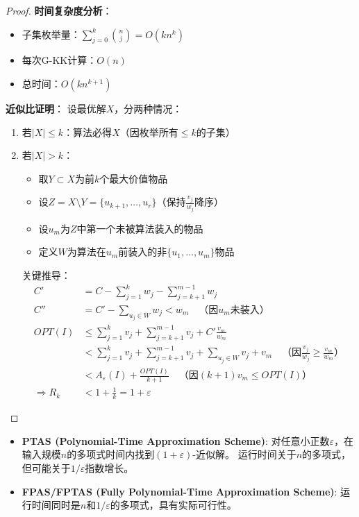 \documentclass[./../main.tex]{subfiles} %
\begin{document}
\begin{proof}
\textbf{时间复杂度分析}：
\begin{itemize}
\item 子集枚举量：$\sum_{j=0}^k \binom{n}{j} = O(kn^k)$
\item 每次G-KK计算：$O(n)$
\item 总时间：$O(kn^{k+1})$
\end{itemize}

\textbf{近似比证明}：
设最优解$X$，分两种情况：
\begin{enumerate}
    \item 若$|X| \leq k$：算法必得$X$（因枚举所有$\leq k$的子集）
    \item 若$|X| > k$：
    \begin{itemize}
        \item 取$Y \subset X$为前$k$个最大价值物品
        \item 设$Z = X \setminus Y = \{u_{k+1},\ldots,u_r\}$（保持$\frac{v_j}{w_j}$降序）
        \item 设$u_m$为$Z$中第一个未被算法装入的物品
        \item 定义$W$为算法在$u_m$前装入的非$\{u_1,\ldots,u_m\}$物品
    \end{itemize}
    
    关键推导：
    \begin{align*}
    C' &= C - \sum_{j=1}^k w_j - \sum_{j=k+1}^{m-1} w_j \\
    C'' &= C' - \sum_{u_j \in W} w_j < w_m \quad \text{（因$u_m$未装入）} \\
    OPT(I) &\leq \sum_{j=1}^k v_j + \sum_{j=k+1}^{m-1} v_j + C'\frac{v_m}{w_m} \\
    &< \sum_{j=1}^k v_j + \sum_{j=k+1}^{m-1} v_j + \sum_{u_j \in W} v_j + v_m \quad \text{（因$\frac{v_j}{w_j} \geq \frac{v_m}{w_m}$）} \\
    &< A_\varepsilon(I) + \frac{OPT(I)}{k+1} \quad \text{（因$(k+1)v_m \leq OPT(I)$）} \\
    \Rightarrow R_k &< 1 + \frac{1}{k} = 1 + \varepsilon
    \end{align*}
\end{enumerate}
\end{proof}

\begin{itemize}
    \item \textbf{PTAS (Polynomial-Time Approximation Scheme)}:
    对任意小正数$\varepsilon$，在输入规模$n$的多项式时间内找到$(1+\varepsilon)$-近似解。
    运行时间关于$n$的多项式，但可能关于$1/\varepsilon$指数增长。
    
    \item \textbf{FPAS/FPTAS (Fully Polynomial-Time Approximation Scheme)}:
    运行时间同时是$n$和$1/\varepsilon$的多项式，具有实际可行性。
\end{itemize}
\end{document}
